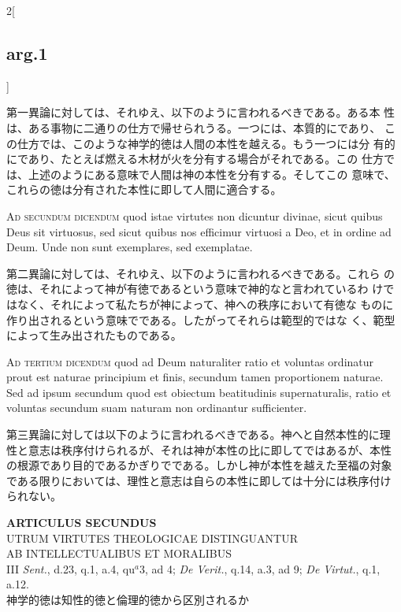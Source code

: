 \documentclass[paper=a4paper,fontsize=10pt,jafontsize=9pt,titlepage]{jlreq}
\begin{document}
\begin{paracol}{2}[\subsection{arg.1}]
\switchcolumn

第一異論に対しては、それゆえ、以下のように言われるべきである。ある本
 性は、ある事物に二通りの仕方で帰せられうる。一つには、本質的にであり、
 この仕方では、このような神学的徳は人間の本性を越える。もう一つには分
 有的にであり、たとえば燃える木材が火を分有する場合がそれである。この
 仕方では、上述のようにある意味で人間は神の本性を分有する。そしてこの
 意味で、これらの徳は分有された本性に即して人間に適合する。

\switchcolumn*[\subsection{ad.2}]

{\scshape Ad secundum dicendum} quod istae virtutes non dicuntur
divinae, sicut quibus Deus sit virtuosus, sed sicut quibus nos
efficimur virtuosi a Deo, et in ordine ad Deum. Unde non sunt
exemplares, sed exemplatae.

\switchcolumn

第二異論に対しては、それゆえ、以下のように言われるべきである。これら
 の徳は、それによって神が有徳であるという意味で神的なと言われているわ
 けではなく、それによって私たちが神によって、神への秩序において有徳な
 ものに作り出されるという意味でである。したがってそれらは範型的ではな
 く、範型によって生み出されたものである。

\switchcolumn*[\subsection{ad.3}]

{\scshape Ad tertium dicendum} quod ad Deum naturaliter ratio et
voluntas ordinatur prout est naturae principium et finis, secundum
tamen proportionem naturae. Sed ad ipsum secundum quod est obiectum
beatitudinis supernaturalis, ratio et voluntas secundum suam naturam
non ordinantur sufficienter.

\switchcolumn

第三異論に対しては以下のように言われるべきである。神へと自然本性的に理
性と意志は秩序付けられるが、それは神が本性の比に即してではあるが、本性
の根源であり目的であるかぎりでである。しかし神が本性を越えた至福の対象
である限りにおいては、理性と意志は自らの本性に即しては十分には秩序付け
られない。

\end{paracol}
\newpage

{}
\setcounter{section}{2}
\setcounter{subsection}{0}
\begin{center}
{\Large {\bfseries ARTICULUS SECUNDUS}}\\
{\large UTRUM VIRTUTES THEOLOGICAE DISTINGUANTUR\\ AB INTELLECTUALIBUS ET MORALIBUS}\\
{\footnotesize III {\itshape Sent.}, d.23, q.1, a.4, qu$^{a}$3, ad 4; {\itshape De Verit.}, q.14, a.3, ad 9; {\itshape De Virtut.}, q.1, a.12.}\\
{\Large 神学的徳は知性的徳と倫理的徳から区別されるか\\}
\end{center}
\end{document}
